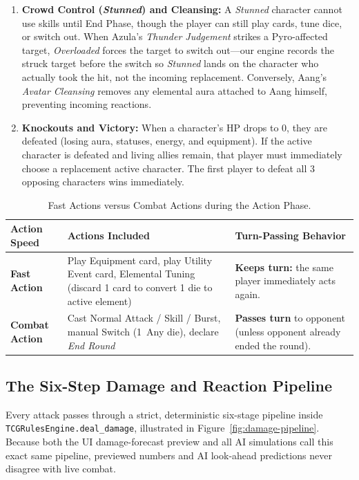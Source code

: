 \documentclass[11pt,a4paper]{article}
\begin{document}
\begin{enumerate}[leftmargin=1.4em, itemsep=2.5pt]
  \item \textbf{Crowd Control (\emph{Stunned}) and Cleansing:} A \emph{Stunned} character cannot use skills until End Phase, though the player can still play cards, tune dice, or switch out. When Azula's \emph{Thunder Judgement} strikes a Pyro-affected target, \emph{Overloaded} forces the target to switch out—our engine records the struck target before the switch so \emph{Stunned} lands on the character who actually took the hit, not the incoming replacement. Conversely, Aang's \emph{Avatar Cleansing} removes any elemental aura attached to Aang himself, preventing incoming reactions.
  \item \textbf{Knockouts and Victory:} When a character's HP drops to 0, they are defeated (losing aura, statuses, energy, and equipment). If the active character is defeated and living allies remain, that player must immediately choose a replacement active character. The first player to defeat all 3 opposing characters wins immediately.
\end{enumerate}

\begin{table}[H]
\centering
\caption{Fast Actions versus Combat Actions during the Action Phase.}
\label{tab:fast-combat}
\small
\begin{tabularx}{\textwidth}{@{}L{2.35cm} L{7.4cm} Y@{}}
\toprule
Action Speed & Actions Included & Turn-Passing Behavior \\
\midrule
\textbf{Fast Action} & Play Equipment card, play Utility Event card, Elemental Tuning (discard 1 card to convert 1 die to active element) & \textbf{Keeps turn:} the same player immediately acts again. \\
\textbf{Combat Action} & Cast Normal Attack / Skill / Burst, manual Switch (1~Any die), declare \emph{End Round} & \textbf{Passes turn} to opponent (unless opponent already ended the round). \\
\bottomrule
\end{tabularx}
\end{table}

\subsection{The Six-Step Damage and Reaction Pipeline}

Every attack passes through a strict, deterministic six-stage pipeline inside \texttt{TCGRulesEngine.deal\_damage}, illustrated in Figure~\ref{fig:damage-pipeline}. Because both the UI damage-forecast preview and all AI simulations call this exact same pipeline, previewed numbers and AI look-ahead predictions never disagree with live combat.
\end{document}
